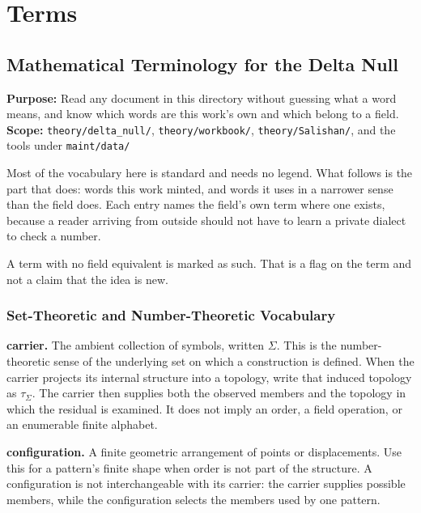 \chapter{Terms}

\section{Mathematical Terminology for the Delta Null}

\textbf{Purpose:} Read any document in this directory without guessing what a word means, and know which words are this work's own and which belong to a field. \textbf{Scope:} \texttt{theory/\allowbreak{}delta\_\allowbreak{}null/\allowbreak{}}, \texttt{theory/\allowbreak{}workbook/\allowbreak{}}, \texttt{theory/\allowbreak{}Salishan/\allowbreak{}}, and the tools under \texttt{maint/\allowbreak{}data/\allowbreak{}}

Most of the vocabulary here is standard and needs no legend. What follows is the part that does: words this work minted, and words it uses in a narrower sense than the field does. Each entry names the field's own term where one exists, because a reader arriving from outside should not have to learn a private dialect to check a number.

A term with no field equivalent is marked as such. That is a flag on the term and not a claim that the idea is new.

\subsection{Set-Theoretic and Number-Theoretic Vocabulary}

\noindent\textbf{carrier.} The ambient collection of symbols, written \(\Sigma\). This is the number-theoretic sense of the underlying set on which a construction is defined. When the carrier projects its internal structure into a topology, write that induced topology as \(\tau_\Sigma\). The carrier then supplies both the observed members and the topology in which the residual is examined. It does not imply an order, a field operation, or an enumerable finite alphabet.

\noindent\textbf{configuration.} A finite geometric arrangement of points or displacements. Use this for a pattern's finite shape when order is not part of the structure. A configuration is not interchangeable with its carrier: the carrier supplies possible members, while the configuration selects the members used by one pattern.


